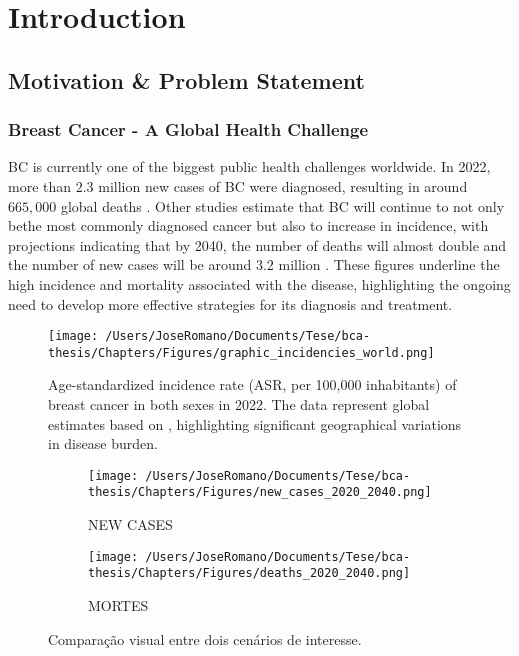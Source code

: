 
%

\chapter{Introduction}
\label{cha:introduction}

\section{Motivation \& Problem Statement}
\label{sec:motivation+problem-statement}
\subsection{Breast Cancer - A Global Health Challenge}

\gls{BC} is currently one of the biggest public health challenges worldwide. In 
2022, more than $2.3$ million new cases of \gls{BC} were diagnosed, resulting in
around $665,\!000$ global deaths \textcite{bcaData2024_bray}. Other studies 
estimate that \gls{BC} will continue to not only bethe most commonly diagnosed 
cancer but also to increase in incidence, with projections indicating that by 
2040, the number of deaths will almost double and the number of new cases will 
be around $3.2$ million \textcite{bca_data_Arnold2022Current}. These figures 
underline the high incidence and mortality associated with the disease, 
highlighting the ongoing need to develop more effective strategies for 
its diagnosis and treatment.

\begin{figure}[h!]
  \centering
  \texttt{[image: /Users/JoseRomano/Documents/Tese/bca-thesis/Chapters/Figures/graphic\_incidencies\_world.png]}
  \caption{Age-standardized incidence rate (ASR, per 100,000 inhabitants) of breast cancer in both sexes in 2022. The data represent global estimates based on \textcite{GLOBOCAN2022}, highlighting significant geographical variations in disease burden.}
\end{figure}

\begin{figure}[h!]
  \centering
  \begin{subfigure}[b]{0.8\textwidth}
    \centering
    \texttt{[image: /Users/JoseRomano/Documents/Tese/bca-thesis/Chapters/Figures/new\_cases\_2020\_2040.png]}
    \caption{NEW CASES}
    \label{fig:imagem1}
  \end{subfigure}
  \vspace{0.5cm}
  \begin{subfigure}[b]{0.8\textwidth}
    \centering
    \texttt{[image: /Users/JoseRomano/Documents/Tese/bca-thesis/Chapters/Figures/deaths\_2020\_2040.png]}
    \caption{MORTES}
    \label{fig:imagem2}
  \end{subfigure}
  \caption{Comparação visual entre dois cenários de interesse.}
  \label{fig:duas-imagens-empilhadas}
\end{figure}

